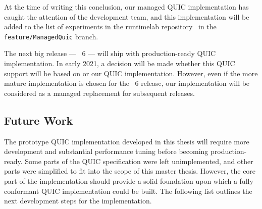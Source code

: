 At the time of writing this conclusion, our managed QUIC implementation has caught the attention of
the \dotnet{} development team, and this implementation will be added to the list of experiments in
the runtimelab repository~\cite{runtimelabGithub} in the \texttt{feature/ManagedQuic} branch.

The next big release --- \dotnet{}~6 --- will ship with production-ready QUIC implementation. In early
2021, a decision will be made whether this QUIC support will be based on \libmsquic{} or our QUIC
implementation. However, even if the more mature \libmsquic{} implementation is chosen for the
\dotnet{}~6 release, our implementation will be considered as a managed replacement for subsequent
\dotnet{} releases.

\subsection*{Future Work}

The prototype QUIC implementation developed in this thesis will require more development and
substantial performance tuning before becoming production-ready. Some parts of the QUIC
specification were left unimplemented, and other parts were simplified to fit into the scope of this
master thesis. However, the core part of the implementation should provide a solid foundation upon
which a fully conformant QUIC implementation could be built. The following list outlines the next
development steps for the implementation.

